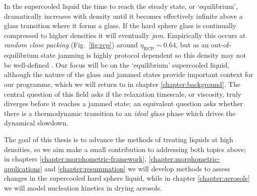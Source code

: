 \documentclass[11pt,twoside]{report}
\begin{document}
In the supercooled liquid the time to reach the steady state, or `equilibrium', dramatically increases with density until it becomes effectively infinite above a glass transition%
 where it forms a glass.
If the hard sphere glass is continually compressed to higher densities it will eventually \emph{jam}.
Empirically this occurs at \emph{random close packing} (Fig.\ \ref{fig:rcp}) around $\eta_\mathrm{RCP} \sim 0.64$, but as an out-of-equilibrium state jamming is highly protocol dependent so this density may not be well-defined \cite{TorquatoRMP2010}.
Our focus will be on the `equilibrium' supercooled liquid, although the nature of the glass and jammed states provide important context for our programme, which we will return to in chapter \ref{chapter:background}.
The central question of this field asks if the relaxation timescale, or viscosity, truly diverges before it reaches a jammed state; an equivalent question asks whether there is a thermodynamic transition to an \emph{ideal glass} phase which drives the dynamical slowdown.

The goal of this thesis is to advance the methods of treating liquids at high densities, so we aim make a small contribution to addressing both topics above; in chapters \ref{chapter:morphometric-framework}, \ref{chapter:morphometric-applications} and \ref{chapter:resummation} we will develop methods to assess changes in the supercooled hard sphere liquid, while in chapter \ref{chapter:aerosols} we will model nucleation kinetics in drying aerosols.

\end{document}

